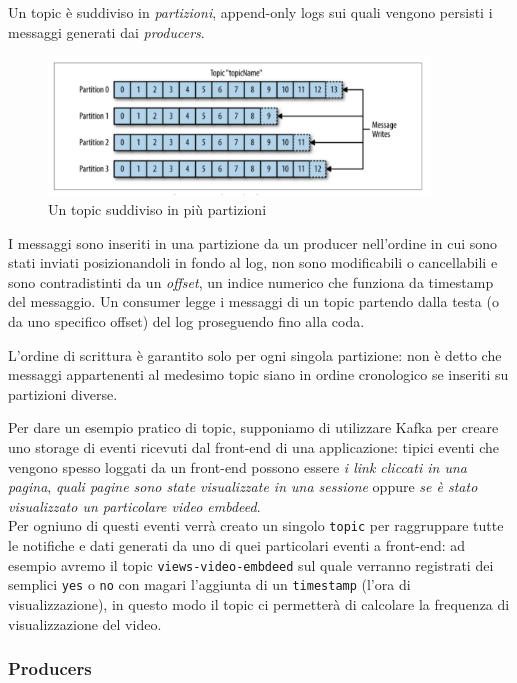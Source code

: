 \documentclass[]{article}
\begin{document}
Un topic è suddiviso in \emph{partizioni}, append-only logs sui quali
vengono persisti i messaggi generati dai \emph{producers}.

\begin{figure}
\centering
\includegraphics[width=0.90000\textwidth]{../images/topic-and-partitions.png}
\caption{Un topic suddiviso in più partizioni \label{figure_3}}
\end{figure}

I messaggi sono inseriti in una partizione da un producer nell'ordine in
cui sono stati inviati posizionandoli in fondo al log, non sono
modificabili o cancellabili e sono contradistinti da un \emph{offset},
un indice numerico che funziona da timestamp del messaggio. Un consumer
legge i messaggi di un topic partendo dalla testa (o da uno specifico
offset) del log proseguendo fino alla coda.

L'ordine di scrittura è garantito solo per ogni singola partizione: non
è detto che messaggi appartenenti al medesimo topic siano in ordine
cronologico se inseriti su partizioni diverse.

Per dare un esempio pratico di topic, supponiamo di utilizzare Kafka per
creare uno storage di eventi ricevuti dal front-end di una applicazione:
tipici eventi che vengono spesso loggati da un front-end possono essere
\emph{i link cliccati in una pagina}, \emph{quali pagine sono state
visualizzate in una sessione} oppure \emph{se è stato visualizzato un
particolare video embdeed}.\\
Per ogniuno di questi eventi verrà creato un singolo \texttt{topic} per
raggruppare tutte le notifiche e dati generati da uno di quei
particolari eventi a front-end: ad esempio avremo il topic
\texttt{views-video-embdeed} sul quale verranno registrati dei semplici
\texttt{yes} o \texttt{no} con magari l'aggiunta di un
\texttt{timestamp} (l'ora di visualizzazione), in questo modo il topic
ci permetterà di calcolare la frequenza di visualizzazione del video.

\newpage

\subsubsection{Producers}\label{producers}
\end{document}

